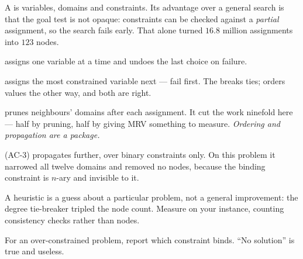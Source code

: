 \begin{chaptersummary}
\begin{tight}
  \item A  is variables, domains and constraints. Its advantage over a
        general search is that the goal test is not opaque: constraints can be
        checked against a \emph{partial} assignment, so the search fails early.
        That alone turned $16.8$ million assignments into $123$ nodes.
  \item {} assigns one variable at a time and undoes the
        last choice on failure.
  \item {} assigns the most constrained variable next --- fail first. The
         breaks ties; 
        orders values the other way, and both are right.
  \item {} prunes neighbours' domains after each assignment.
        It cut the work ninefold here --- half by pruning, half by giving MRV
        something to measure. \emph{Ordering and propagation are a package.}
  \item {} (AC-3) propagates further, over binary constraints
        only. On this problem it narrowed all twelve domains and removed no nodes,
        because the binding constraint is $n$-ary and invisible to it.
  \item A heuristic is a guess about a particular problem, not a general
        improvement: the degree tie-breaker tripled the node count. Measure on
        your instance, counting consistency checks rather than nodes.
  \item For an over-constrained problem, report which constraint binds. ``No
        solution'' is true and useless.
\end{tight}
\end{chaptersummary}

